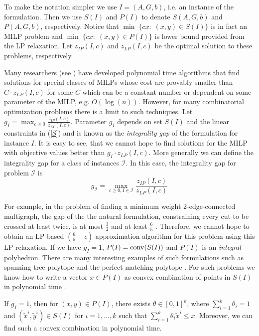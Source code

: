 \documentclass[runningheads]{llncs}
\begin{document}
To make the notation simpler we use $I=(A,G,b)$, i.e. an instance of the formulation. Then we use $S(I)$ and $P(I)$ to denote $S(A,G,b)$ and $P(A,G,b)$, respectively. Notice that $\min \;\{cx:\; (x,y) \in S(I)\}$ is in fact an MILP problem and $\min \;\{cx:\;(x,y)\in P(I) \}$ is lower bound provided from the LP relaxation. Let $z_{IP}(I,c)$ and $z_{LP}(I,c)$ be the optimal solution to these problems, respectively.


Many researchers (see \cite{vazirani,sw}) have developed polynomial time algorithms that find solutions for special classes of MILPs whose cost are provably smaller than $C\cdot z_{LP}(I,c)$ for some $C$ which can be a constant number or dependent on some parameter of the MILP, e.g. $O(\log(n))$. However, for many combinatorial optimization problems there is a limit to such techniques. Let $g_I= \max_{c\geq 0}\frac{z_{IP}(I,c)}{z_{LP}(I,c)}$. Parameter $g_I$ depends on set $S(I)$ and the linear constraints in (\ref{S}) and is known as the \textit{integrality gap} of the formulation for instance $I$. It is easy to see, that we cannot hope to find solutions for the MILP with objective values better than $g_I\cdot z_{LP}(I,c)$. More generally we can define the integrality gap for a class of instances $\mathcal{I}$. In this case, the integrality gap for problem $\mathcal{I}$ is
\begin{equation}
g_\mathcal{I} = \max_{c\geq 0 , I\in\mathcal{I}}\frac{z_{IP}(I,c)}{z_{LP}(I,c)}
\end{equation}


For example, in the problem of finding a minimum weight 2-edge-connected multigraph, the gap of the the natural formulation, constraining every cut to be crossed at least twice, is at most $\frac{3}{2}$ \cite{Wolsey1980} and at least $\frac{6}{5}$ \cite{carr-ravi}. Therefore, we cannot hope to obtain an LP-based $(\frac{6}{5}-\epsilon)$-approximation algorithm for this problem using this LP relaxation. If we have $g_I=1$, $P(I)=\operatorname{conv}(S(I))$ and $P(I)$ is an \textit{integral} polyhedron. There are many interesting examples of such formulations such as spanning tree polytope and the perfect matching polytope \cite{schrijver}. For such problems we know how to write a vector $x\in P(I)$ as convex combination of points in $S(I)$ in polynomial time \cite{cons-cara}.

\begin{proposition}\label{cara}
	If $g_I=1$, then for $(x,y)\in P(I)$, there exists $\theta \in [0,1]^k$, where $\sum_{i=1}^{k}\theta_i =1$ and $(\tilde{x}^i,\tilde{y}^i)\in S(I)$ for $i=1,\ldots,k$ such that $\sum_{i=1}^{k}\theta_i \tilde{x}^i\leq x$. Moreover, we can find such a convex combination in polynomial time.
\end{proposition}
\end{document}
